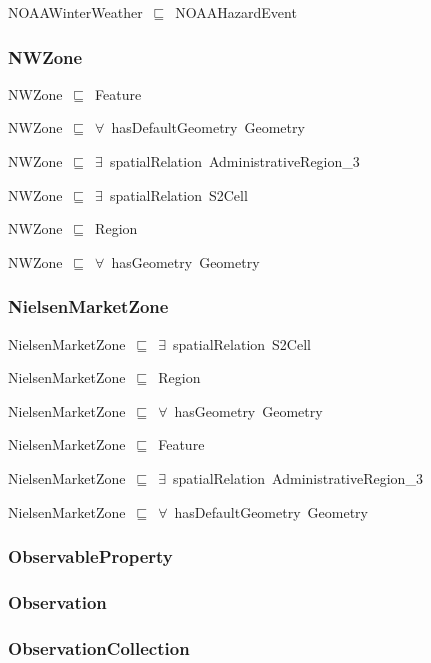 \documentclass{article}
\begin{document}
NOAAWinterWeather~\ensuremath{\sqsubseteq}~NOAAHazardEvent~

\subsubsection*{NWZone}

NWZone~\ensuremath{\sqsubseteq}~Feature~

NWZone~\ensuremath{\sqsubseteq}~\ensuremath{\forall}~hasDefaultGeometry~Geometry~

NWZone~\ensuremath{\sqsubseteq}~\ensuremath{\exists}~spatialRelation~AdministrativeRegion\_3~

NWZone~\ensuremath{\sqsubseteq}~\ensuremath{\exists}~spatialRelation~S2Cell~

NWZone~\ensuremath{\sqsubseteq}~Region~

NWZone~\ensuremath{\sqsubseteq}~\ensuremath{\forall}~hasGeometry~Geometry~

\subsubsection*{NielsenMarketZone}

NielsenMarketZone~\ensuremath{\sqsubseteq}~\ensuremath{\exists}~spatialRelation~S2Cell~

NielsenMarketZone~\ensuremath{\sqsubseteq}~Region~

NielsenMarketZone~\ensuremath{\sqsubseteq}~\ensuremath{\forall}~hasGeometry~Geometry~

NielsenMarketZone~\ensuremath{\sqsubseteq}~Feature~

NielsenMarketZone~\ensuremath{\sqsubseteq}~\ensuremath{\exists}~spatialRelation~AdministrativeRegion\_3~

NielsenMarketZone~\ensuremath{\sqsubseteq}~\ensuremath{\forall}~hasDefaultGeometry~Geometry~

\subsubsection*{ObservableProperty}

\subsubsection*{Observation}

\subsubsection*{ObservationCollection}
\end{document}
